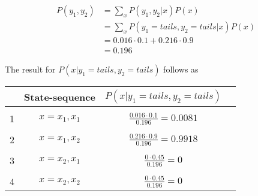 \documentclass[a4paper, 12pt, titlepage]{article}
\begin{document}
\begin{align}
  P(y_1,y_2) &= \sum_{x} P(y_1,y_2|x) P(x)  \\
	     &= \sum_{x} P(y_1=tails,y_2=tails|x) P(x) \\
	     &= 0.016 \cdot 0.1 + 0.216 \cdot 0.9 \\
	     &= 0.196
\end{align}

The result for $P(x|y_1=tails,y_2=tails)$ follows as

\begin{tabular}{l*{2}{c}r}
              & State-sequence &  $P(x|y_1=tails,y_2=tails)$ & \\
\hline
& & & \\
1 & $x=x_1,x_1$ & $\frac{0.016 \cdot 0.1}{0.196} = 0.0081$ \\
& & & \\
2 & $x=x_1,x_2$ & $\frac{0.216 \cdot 0.9}{0.196} =0.9918$ \\
& & & \\
3 & $x=x_2,x_1$ & $\frac{0\cdot 0.45}{0.196} = 0$ \\
& & & \\
4 & $x=x_2,x_2$ & $\frac{0 \cdot 0.45}{0.196} = 0 $ 
 \end{tabular}
\end{document}
